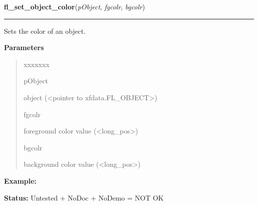 \hspace{.8\funcindent}\begin{boxedminipage}{\funcwidth}

    \raggedright \textbf{fl\_set\_object\_color}(\textit{pObject}, \textit{fgcolr}, \textit{bgcolr})

    \vspace{-1.5ex}

    \rule{\textwidth}{0.5\fboxrule}
\setlength{\parskip}{2ex}
    Sets the color of an object.

\setlength{\parskip}{1ex}
      \textbf{Parameters}
      \vspace{-1ex}

      \begin{quote}
        \begin{Ventry}{xxxxxxx}

          \item[pObject]

          object ({\textless}pointer to xfdata.FL\_OBJECT{\textgreater})

          \item[fgcolr]

          foreground color value ({\textless}long\_pos{\textgreater})

          \item[bgcolr]

          background color value ({\textless}long\_pos{\textgreater})

        \end{Ventry}

      \end{quote}

\textbf{Example:} 

\textbf{Status:} Untested + NoDoc + NoDemo = NOT OK



    \end{boxedminipage}

    \label{xformslib:library:fl_get_object_color}

    \vspace{0.5ex}

